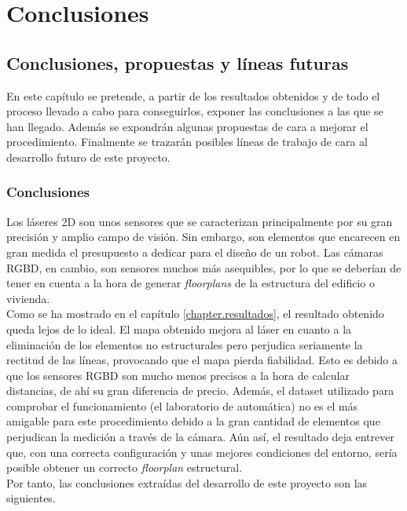 \part{Conclusiones}

\chapter{Conclusiones, propuestas y líneas futuras}

En este capítulo se pretende, a partir de los resultados obtenidos y de todo el proceso llevado a cabo para conseguirlos, exponer las conclusiones a las que se han llegado. Además se expondrán algunas propuestas de cara a mejorar el procedimiento. Finalmente se trazarán posibles líneas de trabajo de cara al desarrollo futuro de este proyecto.\\

\section{Conclusiones}

Los láseres 2D son unos sensores que se caracterizan principalmente por su gran precisión y amplio campo de visión. Sin embargo, son elementos que encarecen en gran medida el presupuesto a dedicar para el diseño de un robot. Las cámaras RGBD, en cambio, son sensores muchos más asequibles, por lo que se deberían de tener en cuenta a la hora de generar \textit{floorplans} de la estructura del edificio o vivienda.\\

Como se ha mostrado en el capítulo \ref{chapter.resultados}, el resultado obtenido queda lejos de lo ideal. El mapa obtenido mejora al láser en cuanto a la eliminación de los elementos no estructurales pero perjudica seriamente la rectitud de las líneas, provocando que el mapa pierda fiabilidad. Esto es debido a que los sensores RGBD son mucho menos precisos a la hora de calcular distancias, de ahí su gran diferencia de precio. Además, el dataset utilizado para comprobar el funcionamiento (el laboratorio de automática) no es el más amigable para este procedimiento debido a la gran cantidad de elementos que perjudican la medición a través de la cámara. Aún así, el resultado deja entrever que, con una correcta configuración y unas mejores condiciones del entorno, sería posible obtener un correcto \textit{floorplan} estructural.\\

Por tanto, las conclusiones extraídas del desarrollo de este proyecto son las siguientes.

